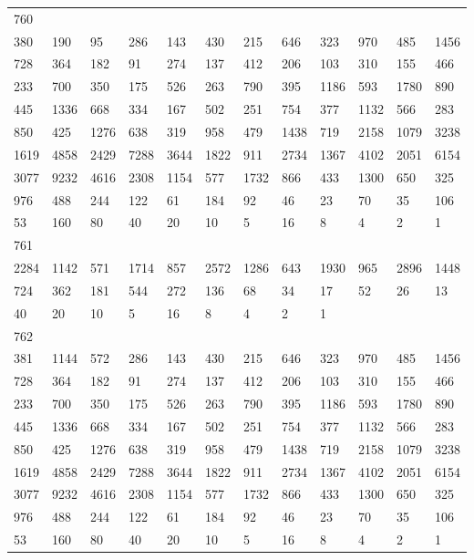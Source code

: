 \begin{longtable}{llllllllllll}
760&&&&&&&&&&&\\
380& 190& 95& 286& 143& 430& 215& 646& 323& 970& 485& 1456\\
728& 364& 182& 91& 274& 137& 412& 206& 103& 310& 155& 466\\
233& 700& 350& 175& 526& 263& 790& 395& 1186& 593& 1780& 890\\
445& 1336& 668& 334& 167& 502& 251& 754& 377& 1132& 566& 283\\
850& 425& 1276& 638& 319& 958& 479& 1438& 719& 2158& 1079& 3238\\
1619& 4858& 2429& 7288& 3644& 1822& 911& 2734& 1367& 4102& 2051& 6154\\
3077& 9232& 4616& 2308& 1154& 577& 1732& 866& 433& 1300& 650& 325\\
976& 488& 244& 122& 61& 184& 92& 46& 23& 70& 35& 106\\
53& 160& 80& 40& 20& 10& 5& 16& 8& 4& 2& 1\\

761&&&&&&&&&&&\\
2284& 1142& 571& 1714& 857& 2572& 1286& 643& 1930& 965& 2896& 1448\\
724& 362& 181& 544& 272& 136& 68& 34& 17& 52& 26& 13\\
40& 20& 10& 5& 16& 8& 4& 2& 1& \\

762&&&&&&&&&&&\\
381& 1144& 572& 286& 143& 430& 215& 646& 323& 970& 485& 1456\\
728& 364& 182& 91& 274& 137& 412& 206& 103& 310& 155& 466\\
233& 700& 350& 175& 526& 263& 790& 395& 1186& 593& 1780& 890\\
445& 1336& 668& 334& 167& 502& 251& 754& 377& 1132& 566& 283\\
850& 425& 1276& 638& 319& 958& 479& 1438& 719& 2158& 1079& 3238\\
1619& 4858& 2429& 7288& 3644& 1822& 911& 2734& 1367& 4102& 2051& 6154\\
3077& 9232& 4616& 2308& 1154& 577& 1732& 866& 433& 1300& 650& 325\\
976& 488& 244& 122& 61& 184& 92& 46& 23& 70& 35& 106\\
53& 160& 80& 40& 20& 10& 5& 16& 8& 4& 2& 1\\


\end{longtable}
